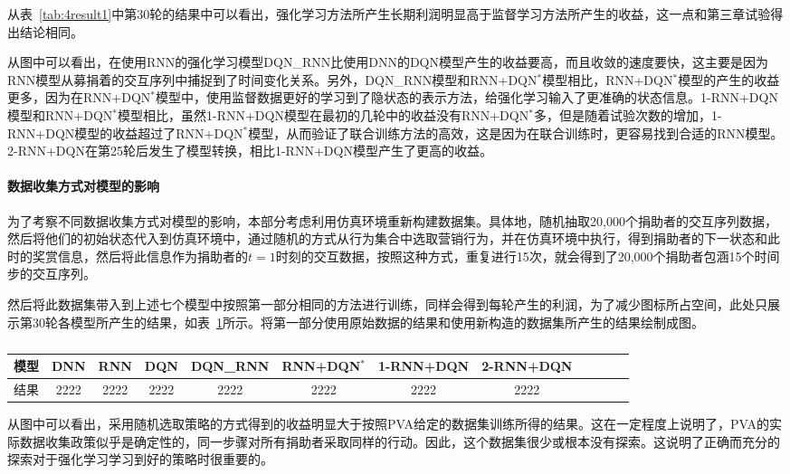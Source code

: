 从表~\ref{tab:4result1}中第30轮的结果中可以看出，强化学习方法所产生长期利润明显高于监督学习方法所产生的收益，这一点和第三章试验得出结论相同。

从图中可以看出，在使用RNN的强化学习模型DQN_RNN比使用DNN的DQN模型产生的收益要高，而且收敛的速度要快，这主要是因为RNN模型从募捐着的交互序列中捕捉到了时间变化关系。另外，DQN_RNN模型和RNN+DQN$^{*}$模型相比，RNN+DQN$^{*}$模型的产生的收益更多，因为在RNN+DQN$^{*}$模型中，使用监督数据更好的学习到了隐状态的表示方法，给强化学习输入了更准确的状态信息。1-RNN+DQN模型和RNN+DQN$^{*}$模型相比，虽然1-RNN+DQN模型在最初的几轮中的收益没有RNN+DQN$^{*}$多，但是随着试验次数的增加，1-RNN+DQN模型的收益超过了RNN+DQN$^{*}$模型，从而验证了联合训练方法的高效，这是因为在联合训练时，更容易找到合适的RNN模型。2-RNN+DQN在第25轮后发生了模型转换，相比1-RNN+DQN模型产生了更高的收益。

\paragraph{数据收集方式对模型的影响}

 为了考察不同数据收集方式对模型的影响，本部分考虑利用仿真环境重新构建数据集。具体地，随机抽取20,000个捐助者的交互序列数据，然后将他们的初始状态代入到仿真环境中，通过随机的方式从行为集合中选取营销行为，并在仿真环境中执行，得到捐助者的下一状态和此时的奖赏信息，然后将此信息作为捐助者的$t=1$时刻的交互数据，按照这种方式，重复进行15次，就会得到了20,000个捐助者包涵15个时间步的交互序列。

 然后将此数据集带入到上述七个模型中按照第一部分相同的方法进行训练，同样会得到每轮产生的利润，为了减少图标所占空间，此处只展示第30轮各模型所产生的结果，如表~\ref{tab:4result2}所示。将第一部分使用原始数据的结果和使用新构造的数据集所产生的结果绘制成图。

  \begin{table}[htbp]
  \centering
  \footnotesize
  \caption{}
  \label{tab:4result2}
  \begin{tabular}{lccccccccccc}  
     \toprule
      模型 &DNN&RNN&DQN&DQN_RNN&RNN+DQN$^{*}$&1-RNN+DQN&2-RNN+DQN\\
    \midrule
      结果 &2222&2222&2222&2222&2222&2222&2222&\\
    \bottomrule
  \end{tabular}
\end{table}

从图中可以看出，采用随机选取策略的方式得到的收益明显大于按照PVA给定的数据集训练所得的结果。这在一定程度上说明了，PVA的实际数据收集政策似乎是确定性的，同一步骤对所有捐助者采取同样的行动。因此，这个数据集很少或根本没有探索。这说明了正确而充分的探索对于强化学习学习到好的策略时很重要的。


